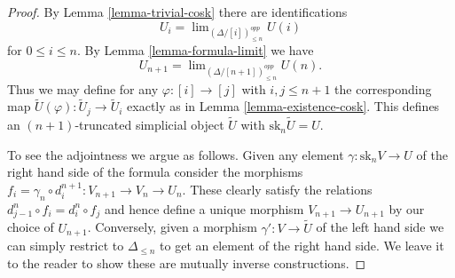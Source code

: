 \documentclass{stacks-project}
\theoremstyle{plain}
\theoremstyle{definition}
\theoremstyle{remark}
\numberwithin{equation}{subsection}
\def\lim{\mathop{\mathrm{lim}}\nolimits}
\begin{document}
\begin{proof}
By Lemma \ref{lemma-trivial-cosk} there are identifications
$$
U_i = \lim_{(\Delta/[i])_{\leq n}^{opp}} U(i)
$$
for $0 \leq i \leq n$. By Lemma \ref{lemma-formula-limit}
we have
$$
U_{n + 1} = \lim_{(\Delta/[n + 1])_{\leq n}^{opp}} U(n).
$$
Thus we may define for any $\varphi : [i] \to [j]$
with $i, j \leq n + 1$ the corresponding map
$\tilde U(\varphi) : \tilde U_j \to \tilde U_i$ exactly as
in Lemma \ref{lemma-existence-cosk}. This defines
an $(n + 1)$-truncated simplicial object $\tilde U$
with $\text{sk}_n \tilde U = U$.

\medskip\noindent
To see the adjointness we argue as follows. Given any element
$\gamma : \text{sk}_n V \to U$ of the right hand side of the formula
consider the morphisms
$f_i = \gamma_n \circ d^{n + 1}_i : V_{n + 1} \to V_n \to U_n$.
These clearly satisfy the relations $d^n_{j - 1} \circ f_i = d^n_i \circ f_j$
and hence define a unique morphism $V_{n + 1} \to U_{n + 1}$
by our choice of $U_{n + 1}$.
Conversely, given a morphism $\gamma' : V \to \tilde U$
of the left hand side we can simply restrict to
$\Delta_{\leq n}$ to get an element of the right hand side.
We leave it to the reader to show these are mutually inverse
constructions.
\end{proof}
\end{document}
